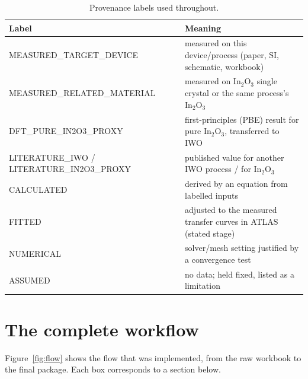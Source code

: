 \documentclass[11pt,a4paper]{article}
\begin{document}
\begin{table}[H]\centering\small
\caption{Provenance labels used throughout.}\label{tab:labels}
\begin{tabular}{ll}\toprule
Label & Meaning\\\midrule
MEASURED\_TARGET\_DEVICE & measured on this device/process (paper, SI, schematic, workbook)\\
MEASURED\_RELATED\_MATERIAL & measured on In$_2$O$_3$ single crystal or the same process's In$_2$O$_3$\\
DFT\_PURE\_IN2O3\_PROXY & first-principles (PBE) result for pure In$_2$O$_3$, transferred to IWO\\
LITERATURE\_IWO / LITERATURE\_IN2O3\_PROXY & published value for another IWO process / for In$_2$O$_3$\\
CALCULATED & derived by an equation from labelled inputs\\
FITTED & adjusted to the measured transfer curves in ATLAS (stated stage)\\
NUMERICAL & solver/mesh setting justified by a convergence test\\
ASSUMED & no data; held fixed, listed as a limitation\\
\bottomrule\end{tabular}
\end{table}

\section{The complete workflow}
Figure~\ref{fig:flow} shows the flow that was implemented, from the raw workbook to the final package. Each box corresponds to a section below.
\end{document}
